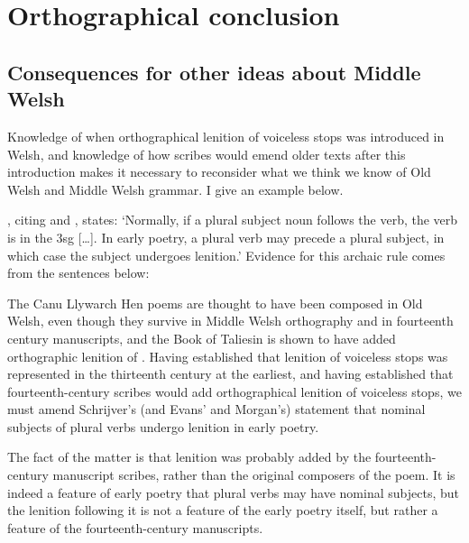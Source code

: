 
\chapter{Orthographical conclusion}
\label{cha:orth-concl}



\section{Consequences for other ideas about Middle Welsh}
\label{sec:cons-other-ideas}
Knowledge of when orthographical lenition of voiceless stops was introduced in Welsh, and knowledge of how scribes would emend older texts after this introduction makes it necessary to reconsider what we think we know of Old Welsh and Middle Welsh grammar. I give an example below.

\Textcite[2]{schrijver_free_2010}, citing \textcite[18, 179]{evans_grammar_1964} and \textcite[193n]{morgan_y_1952}, states:
`Normally, if a plural subject noun follows the verb, the verb is in the 3sg [\dots]. In early poetry, a plural verb may precede a plural subject, in which case the subject undergoes lenition.' Evidence for this archaic rule comes from the sentences below:
\begin{mwl}
\end{mwl}

The Canu Llywarch Hen poems are thought to have been composed in Old Welsh, even though they survive in Middle Welsh orthography and in fourteenth century manuscripts, and the Book of Taliesin is shown to have added orthographic lenition of . Having established that  lenition of voiceless stops was represented in the thirteenth century at the earliest, and having established that fourteenth-century scribes would add orthographical lenition of voiceless stops, we must amend Schrijver's (and Evans' and Morgan's) statement that nominal subjects of plural verbs undergo lenition in early poetry.

The fact of the matter is that lenition was probably added by the fourteenth-century manuscript scribes, rather than the original composers of the poem. It is indeed a feature of early poetry that plural verbs may have nominal subjects, but the lenition following it is not a feature of the early poetry itself, but rather a feature of the fourteenth-century manuscripts.

